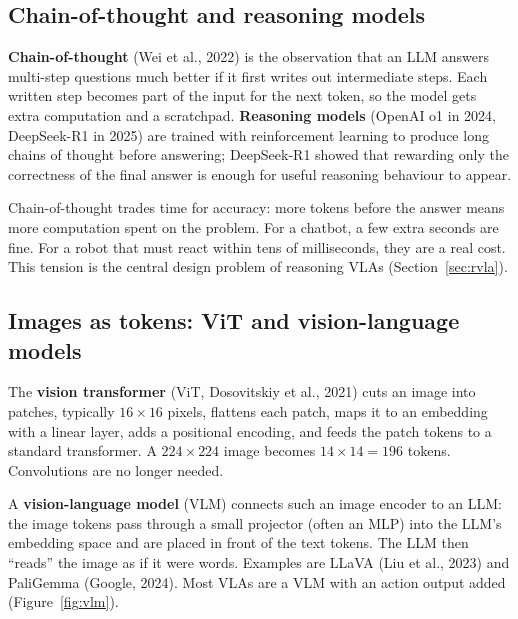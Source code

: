 \subsection{Chain-of-thought and reasoning models}
\textbf{Chain-of-thought} (Wei et al., 2022) is the observation that an LLM answers multi-step questions much better if it first writes out intermediate steps. Each written step becomes part of the input for the next token, so the model gets extra computation and a scratchpad. \textbf{Reasoning models} (OpenAI o1 in 2024, DeepSeek-R1 in 2025) are trained with reinforcement learning to produce long chains of thought before answering; DeepSeek-R1 showed that rewarding only the correctness of the final answer is enough for useful reasoning behaviour to appear.

\begin{plainbox}
Chain-of-thought trades time for accuracy: more tokens before the answer means more computation spent on the problem. For a chatbot, a few extra seconds are fine. For a robot that must react within tens of milliseconds, they are a real cost. This tension is the central design problem of reasoning VLAs (Section~\ref{sec:rvla}).
\end{plainbox}

\subsection{Images as tokens: ViT and vision-language models}
The \textbf{vision transformer} (ViT, Dosovitskiy et al., 2021) cuts an image into patches, typically $16\times16$ pixels, flattens each patch, maps it to an embedding with a linear layer, adds a positional encoding, and feeds the patch tokens to a standard transformer. A $224\times224$ image becomes $14\times14=196$ tokens. Convolutions are no longer needed.

A \textbf{vision-language model} (VLM) connects such an image encoder to an LLM: the image tokens pass through a small projector (often an MLP) into the LLM's embedding space and are placed in front of the text tokens. The LLM then ``reads'' the image as if it were words. Examples are LLaVA (Liu et al., 2023) and PaliGemma (Google, 2024). Most VLAs are a VLM with an action output added (Figure~\ref{fig:vlm}).

